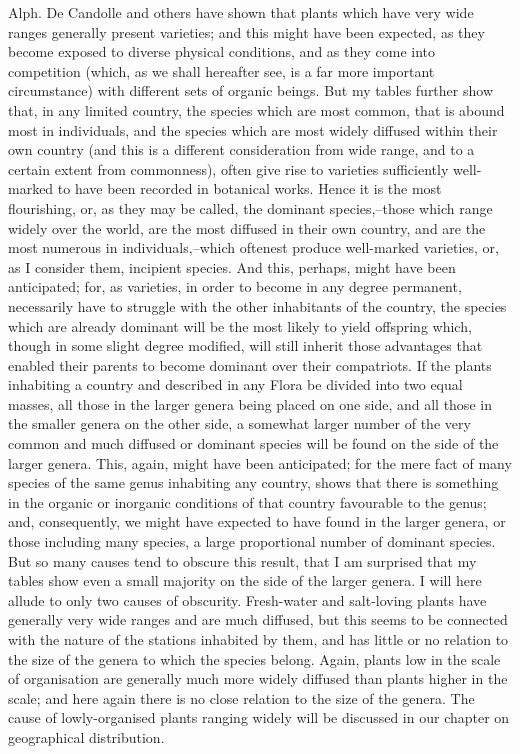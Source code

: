 Alph. De Candolle and others have shown that plants which have very wide ranges generally present varieties; and this might have been expected, as they become exposed to diverse physical conditions, and as they come into competition (which, as we shall hereafter see, is a far more important circumstance) with different sets of organic beings. But my tables further show that, in any limited country, the species which are most common, that is abound most in individuals, and the species which are most widely diffused within their own country (and this is a different consideration from wide range, and to a certain extent from commonness), often give rise to varieties sufficiently well-marked to have been recorded in botanical works. Hence it is the most flourishing, or, as they may be called, the dominant species,--those which range widely over the world, are the most diffused in their own country, and are the most numerous in individuals,--which oftenest produce well-marked varieties, or, as I consider them, incipient species. And this, perhaps, might have been anticipated; for, as varieties, in order to become in any degree permanent, necessarily have to struggle with the other inhabitants of the country, the species which are already dominant will be the most likely to yield offspring which, though in some slight degree modified, will still inherit those advantages that enabled their parents to become dominant over their compatriots.
If the plants inhabiting a country and described in any Flora be divided into two equal masses, all those in the larger genera being placed on one side, and all those in the smaller genera on the other side, a somewhat larger number of the very common and much diffused or dominant species will be found on the side of the larger genera. This, again, might have been anticipated; for the mere fact of many species of the same genus inhabiting any country, shows that there is something in the organic or inorganic conditions of that country favourable to the genus; and, consequently, we might have expected to have found in the larger genera, or those including many species, a large proportional number of dominant species. But so many causes tend to obscure this result, that I am surprised that my tables show even a small majority on the side of the larger genera. I will here allude to only two causes of obscurity. Fresh-water and salt-loving plants have generally very wide ranges and are much diffused, but this seems to be connected with the nature of the stations inhabited by them, and has little or no relation to the size of the genera to which the species belong. Again, plants low in the scale of organisation are generally much more widely diffused than plants higher in the scale; and here again there is no close relation to the size of the genera. The cause of lowly-organised plants ranging widely will be discussed in our chapter on geographical distribution.
